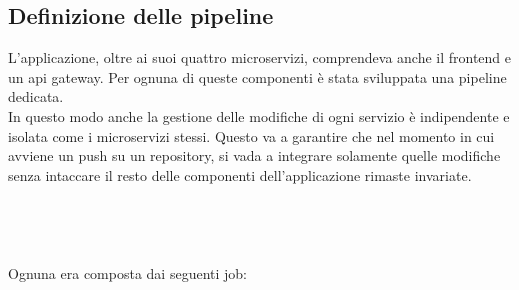 \documentclass[a4paper,12pt]{report}
\begin{document}
\subsection{Definizione delle pipeline}
L'applicazione, oltre ai suoi quattro microservizi, comprendeva anche il frontend e un api gateway. Per ognuna di queste componenti è stata sviluppata una pipeline dedicata.\\
In questo modo anche la gestione delle modifiche di ogni servizio è indipendente e isolata come i microservizi stessi. Questo va a garantire che nel momento in cui avviene un push su un repository, si vada a integrare solamente quelle modifiche senza intaccare il resto delle componenti dell'applicazione rimaste invariate.\\ \\ \\ \\ \\
Ognuna era composta dai seguenti job:\\
\end{document}
